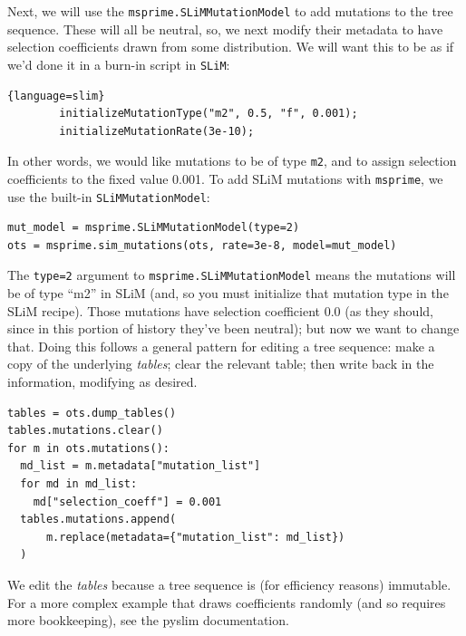 \documentclass[12pt]{article}
\newcommand{\msprime}[0]{\texttt{msprime}\xspace}
\newcommand{\slim}[0]{\texttt{SLiM}\xspace}
\begin{document}
Next, we will use the \verb|msprime.SLiMMutationModel| to add mutations to the tree sequence.
These will all be neutral,
so, we next modify their metadata to have selection coefficients drawn from some distribution.
We will want this to be as if we'd done it in a burn-in script in \slim:
\begin{lstlisting}{language=slim}
        initializeMutationType("m2", 0.5, "f", 0.001);
        initializeMutationRate(3e-10);
\end{lstlisting}
In other words, we would like mutations to be of type \verb|m2|,
and to assign selection coefficients to the fixed value 0.001.
To add SLiM mutations with \msprime, we use the built-in
\verb|SLiMMutationModel|:
\begin{listing}[H]
    \begin{verbatim}
mut_model = msprime.SLiMMutationModel(type=2)
ots = msprime.sim_mutations(ots, rate=3e-8, model=mut_model)
  \end{verbatim}
\end{listing}
The \verb|type=2| argument to \verb|msprime.SLiMMutationModel|
means the mutations will be of type ``m2'' in SLiM
(and, so you must initialize that mutation type in the SLiM recipe).
Those mutations have selection coefficient 0.0
(as they should, since in this portion of history they've been neutral);
but now we want to change that.
Doing this follows a general pattern for editing a tree sequence:
make a copy of the underlying \emph{tables};
clear the relevant table;
then write back in the information, modifying as desired.
\begin{listing}[H]
    \begin{verbatim}
tables = ots.dump_tables()
tables.mutations.clear()
for m in ots.mutations():
  md_list = m.metadata["mutation_list"]
  for md in md_list:
    md["selection_coeff"] = 0.001
  tables.mutations.append(
      m.replace(metadata={"mutation_list": md_list})
  )
  \end{verbatim}
\end{listing}
We edit the \emph{tables} because a tree sequence is (for efficiency reasons) immutable.
For a more complex example that draws coefficients randomly (and so requires more bookkeeping),
see the pyslim documentation.
\end{document}
